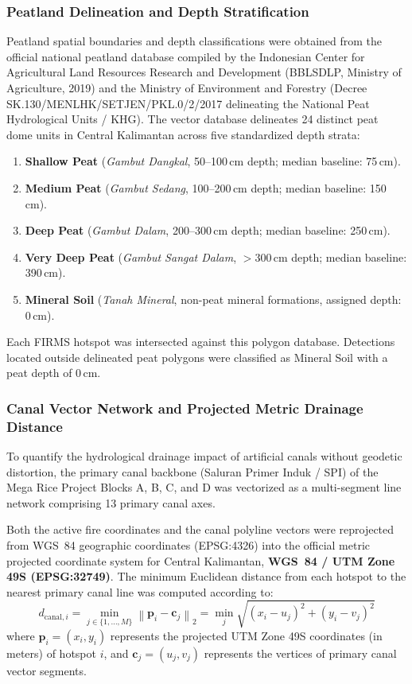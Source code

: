 \subsubsection{Peatland Delineation and Depth Stratification}
\label{subsubsec:peat_depth}

Peatland spatial boundaries and depth classifications were obtained from the official national peatland database compiled by the Indonesian Center for Agricultural Land Resources Research and Development (BBLSDLP, Ministry of Agriculture, 2019) and the Ministry of Environment and Forestry (Decree SK.130/MENLHK/SETJEN/PKL.0/2/2017 delineating the National Peat Hydrological Units / KHG). The vector database delineates 24 distinct peat dome units in Central Kalimantan across five standardized depth strata:
\begin{enumerate}
    \item \textbf{Shallow Peat} (\textit{Gambut Dangkal}, 50--100\,cm depth; median baseline: 75\,cm).
    \item \textbf{Medium Peat} (\textit{Gambut Sedang}, 100--200\,cm depth; median baseline: 150\,cm).
    \item \textbf{Deep Peat} (\textit{Gambut Dalam}, 200--300\,cm depth; median baseline: 250\,cm).
    \item \textbf{Very Deep Peat} (\textit{Gambut Sangat Dalam}, $>300$\,cm depth; median baseline: 390\,cm).
    \item \textbf{Mineral Soil} (\textit{Tanah Mineral}, non-peat mineral formations, assigned depth: 0\,cm).
\end{enumerate}
Each FIRMS hotspot was intersected against this polygon database. Detections located outside delineated peat polygons were classified as Mineral Soil with a peat depth of 0\,cm.

\subsubsection{Canal Vector Network and Projected Metric Drainage Distance}
\label{subsubsec:canal_network}

To quantify the hydrological drainage impact of artificial canals without geodetic distortion, the primary canal backbone (Saluran Primer Induk / SPI) of the Mega Rice Project Blocks A, B, C, and D was vectorized as a multi-segment line network comprising 13 primary canal axes.

Both the active fire coordinates and the canal polyline vectors were reprojected from WGS~84 geographic coordinates (EPSG:4326) into the official metric projected coordinate system for Central Kalimantan, \textbf{WGS~84 / UTM Zone 49S (EPSG:32749)}. The minimum Euclidean distance from each hotspot to the nearest primary canal line was computed according to:
\begin{equation}
d_{\text{canal}, i} = \min_{j \in \{1, \dots, M\}} \left\| \mathbf{p}_i - \mathbf{c}_j \right\|_2 = \min_{j} \sqrt{(x_i - u_j)^2 + (y_i - v_j)^2}
\label{eq:canal_dist}
\end{equation}
where $\mathbf{p}_i = (x_i, y_i)$ represents the projected UTM Zone 49S coordinates (in meters) of hotspot $i$, and $\mathbf{c}_j = (u_j, v_j)$ represents the vertices of primary canal vector segments.

